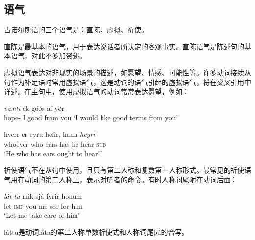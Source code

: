 \subsection{语气}
古诺尔斯语的三个语气是：直陈、虚拟、祈使。

直陈是最基本的语气，用于表达说话者所认定的客观事实。直陈语气是陈述句的基本语气，对此不多加赘述。

虚拟语气表达对非现实的场景的描述，如愿望、情感、可能性等。许多动词接续从句作为补足语时常用虚拟语气，这是动词的语气引起的虚拟语气，将在交叉引用中详述。在主句中，使用虚拟语气的动词常常表达愿望，例如：
\begin{exe}
    \ex
    \gll \textit{vænti} ek góðs af yðr\\
    hope-{\sub} I good from you
    \trans `I would like good terms from you'

    \ex
    \gll hverr	er	eyru	hefir,	hann	\textit{heyri}\\
    whoever	who	ears	has	he	hear-\textsc{sub}\\
    \trans `He who has ears ought to hear!’

\end{exe}

祈使语气不在从句中使用，且只有第二人称和复数第一人称形式。最常见的祈使语气用在动词的第二人称上，表示对听者的命令。有时人称词尾附在动词后面：
\begin{exe}
    \ex
    \gll \textit{lát-tu}	mik	sjá	fyrir	honum\\
    let-\textsc{imp}-you	me	see	for	him\\
    \trans `Let me take care of him’
\end{exe}

láttu是动词láta的第二人称单数祈使式和人称词尾þú的合写。
